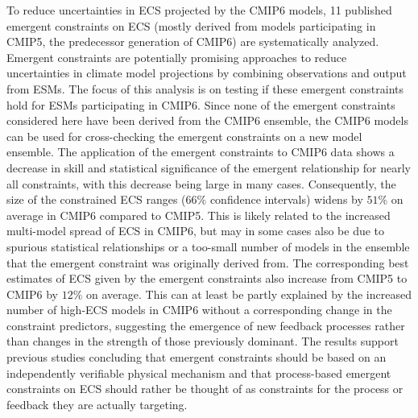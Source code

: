 To reduce uncertainties in \acs{ECS} projected by the \acs{CMIP}6 models, 11
published emergent constraints on \acs{ECS} (mostly derived from models
participating in \acs{CMIP}5, the predecessor generation of \acs{CMIP}6) are
systematically analyzed. Emergent constraints are potentially promising
approaches to reduce uncertainties in climate model projections by combining
observations and output from \acsp{ESM}. The focus of this analysis is on
testing if these emergent constraints hold for \acsp{ESM} participating in
\acs{CMIP}6. Since none of the emergent constraints considered here have been
derived from the \acs{CMIP}6 ensemble, the \acs{CMIP}6 models can be used for
cross-checking the emergent constraints on a new model ensemble. The
application of the emergent constraints to \acs{CMIP}6 data shows a decrease in
skill and statistical significance of the emergent relationship for nearly all
constraints, with this decrease being large in many cases. Consequently, the
size of the constrained \acs{ECS} ranges ($66 \unit{\%}$ confidence intervals)
widens by $51 \unit{\%}$ on average in \acs{CMIP}6 compared to \acs{CMIP}5.
This is likely related to the increased multi-model spread of \acs{ECS} in
\acs{CMIP}6, but may in some cases also be due to spurious statistical
relationships or a too-small number of models in the ensemble that the emergent
constraint was originally derived from. The corresponding best estimates of
\acs{ECS} given by the emergent constraints also increase from \acs{CMIP}5 to
\acs{CMIP}6 by $12 \unit{\%}$ on average. This can at least be partly explained
by the increased number of high-\acs{ECS} models in \acs{CMIP}6 without a
corresponding change in the constraint predictors, suggesting the emergence of
new feedback processes rather than changes in the strength of those previously
dominant. The results support previous studies concluding that emergent
constraints should be based on an independently verifiable physical mechanism
and that process-based emergent constraints on \acs{ECS} should rather be
thought of as constraints for the process or feedback they are actually
targeting.

